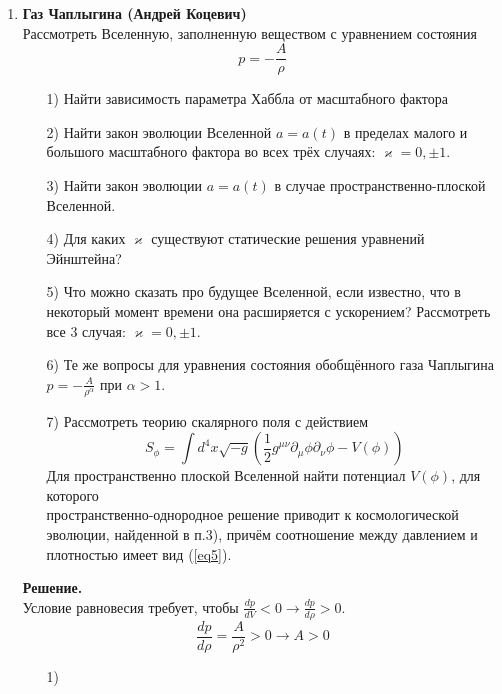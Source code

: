 \documentclass[12pt]{article}
\theoremstyle{definition}
\begin{document}
\begin{enumerate}
    \item \textbf{Газ Чаплыгина (Андрей Коцевич)}\\
    Рассмотреть Вселенную, заполненную веществом с уравнением состояния
    \begin{equation}\label{eq5}
        p=-\frac{A}{\rho}
    \end{equation}
    \begin{itemize}
        \item[1)] Найти зависимость параметра Хаббла от масштабного фактора
        \item[2)] Найти закон эволюции Вселенной $a=a(t)$ в пределах малого и большого масштабного фактора во всех трёх случаях: $\varkappa=0,\pm1$.
        \item[3)] Найти закон эволюции $a=a(t)$ в случае пространственно-плоской Вселенной.
        \item[4)] Для каких $\varkappa$ существуют статические решения уравнений Эйнштейна?
        \item[5)] Что можно сказать про будущее Вселенной, если известно, что в некоторый момент времени она расширяется с ускорением? Рассмотреть все 3 случая: $\varkappa=0,\pm1$.
        \item[6)] Те же вопросы для уравнения состояния обобщённого газа Чаплыгина $p=-\frac{A}{\rho^\alpha}$ при $\alpha>1$.
        \item[7)] Рассмотреть теорию скалярного поля с действием
        \begin{equation}
            S_\phi=\int d^4x\sqrt{-g}\left(\frac{1}{2}g^{\mu\nu}\partial_\mu\phi\partial_\nu\phi-V(\phi)\right)
        \end{equation}
        Для пространственно плоской Вселенной найти потенциал $V(\phi)$, для которого\\ пространственно-однородное решение приводит к космологической эволюции, найденной в п.3), причём соотношение между давлением и плотностью имеет вид (\ref{eq5}).
    \end{itemize}
    \textbf{Решение.}\\
    Условие равновесия требует, чтобы $\frac{dp}{dV}<0\rightarrow\frac{dp}{d\rho}>0$.
    \begin{equation}
        \frac{dp}{d\rho}=\frac{A}{\rho^2}>0\rightarrow \boxed{A>0}
    \end{equation}
    \begin{itemize}
        \item[1)]
        \begin{equation}

\end{equation}
\end{itemize}
\end{enumerate}
\end{document}
